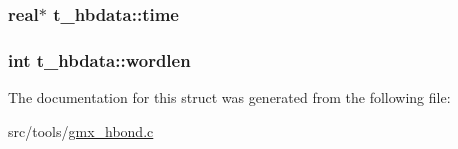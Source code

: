 \hypertarget{structt__hbdata_a137817716d88606ddef69932da506496}{
\subsubsection[{time}]{\setlength{\rightskip}{0pt plus 5cm}real$\ast$ {\bf t\-\_\-hbdata\-::time}}}\label{structt__hbdata_a137817716d88606ddef69932da506496}
\hypertarget{structt__hbdata_aeebe25bcfa29f95610bea3bf66c5ee77}{
\subsubsection[{wordlen}]{\setlength{\rightskip}{0pt plus 5cm}int {\bf t\-\_\-hbdata\-::wordlen}}}\label{structt__hbdata_aeebe25bcfa29f95610bea3bf66c5ee77}


\-The documentation for this struct was generated from the following file\-:\begin{DoxyCompactItemize}
\item 
src/tools/\hyperlink{gmx__hbond_8c}{gmx\-\_\-hbond.\-c}\end{DoxyCompactItemize}
